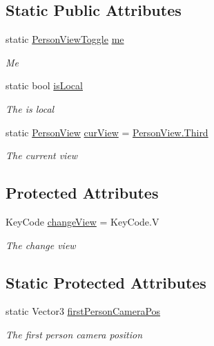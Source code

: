 \subsection*{Static Public Attributes}
\begin{DoxyCompactItemize}
\item 
static \hyperlink{class_lerp2_a_p_i_1_1_controllers_1_1_person_view_1_1_person_view_toggle}{Person\+View\+Toggle} \hyperlink{class_lerp2_a_p_i_1_1_controllers_1_1_person_view_1_1_person_view_toggle_ae2db5cfc18a61e5f92e924278fc1e6f4}{me}
\begin{DoxyCompactList}\small\item\em Me \end{DoxyCompactList}\item 
static bool \hyperlink{class_lerp2_a_p_i_1_1_controllers_1_1_person_view_1_1_person_view_toggle_a682f4dd574e4ce70f7162858381b6aee}{is\+Local}
\begin{DoxyCompactList}\small\item\em The is local \end{DoxyCompactList}\item 
static \hyperlink{namespace_lerp2_a_p_i_1_1_controllers_1_1_person_view_a3d0b30b4a4e8e12044ec2f5a78cec0ca}{Person\+View} \hyperlink{class_lerp2_a_p_i_1_1_controllers_1_1_person_view_1_1_person_view_toggle_a665469ca585683fe7204c72a3b4f907d}{cur\+View} = \hyperlink{namespace_lerp2_a_p_i_1_1_controllers_1_1_person_view_a3d0b30b4a4e8e12044ec2f5a78cec0caa168909c0b6f1dfbd48f679d47059c1d6}{Person\+View.\+Third}
\begin{DoxyCompactList}\small\item\em The current view \end{DoxyCompactList}\end{DoxyCompactItemize}
\subsection*{Protected Attributes}
\begin{DoxyCompactItemize}
\item 
Key\+Code \hyperlink{class_lerp2_a_p_i_1_1_controllers_1_1_person_view_1_1_person_view_toggle_a6d92d00665edd63a43120313af94c8a5}{change\+View} = Key\+Code.\+V
\begin{DoxyCompactList}\small\item\em The change view \end{DoxyCompactList}\end{DoxyCompactItemize}
\subsection*{Static Protected Attributes}
\begin{DoxyCompactItemize}
\item 
static Vector3 \hyperlink{class_lerp2_a_p_i_1_1_controllers_1_1_person_view_1_1_person_view_toggle_a527a06e969b1a568e21a54a504d4e59d}{first\+Person\+Camera\+Pos}
\begin{DoxyCompactList}\small\item\em The first person camera position \end{DoxyCompactList}\end{DoxyCompactItemize}
